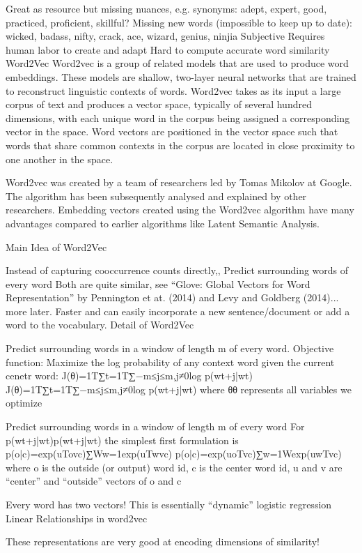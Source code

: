 Great as resource but missing nuances, e.g. synonyms: adept, expert, good, practiced, proficient, skillful?
Missing new words (impossible to keep up to date): wicked, badass, nifty, crack, ace, wizard, genius, ninjia
Subjective
Requires human labor to create and adapt
Hard to compute accurate word similarity
Word2Vec
Word2vec is a group of related models that are used to produce word embeddings. These models are shallow, two-layer neural networks that are trained to reconstruct linguistic contexts of words. Word2vec takes as its input a large corpus of text and produces a vector space, typically of several hundred dimensions, with each unique word in the corpus being assigned a corresponding vector in the space. Word vectors are positioned in the vector space such that words that share common contexts in the corpus are located in close proximity to one another in the space.

Word2vec was created by a team of researchers led by Tomas Mikolov at Google. The algorithm has been subsequently analysed and explained by other researchers. Embedding vectors created using the Word2vec algorithm have many advantages compared to earlier algorithms like Latent Semantic Analysis.

Main Idea of Word2Vec

Instead of capturing cooccurrence counts directly,,
Predict surrounding words of every word
Both are quite similar, see “Glove: Global Vectors for Word Representation” by Pennington et at. (2014) and Levy and Goldberg (2014)... more later.
Faster and can easily incorporate a new sentence/document or add a word to the vocabulary.
Detail of Word2Vec

Predict surrounding words in a window of length m of every word.
Objective function: Maximize the log probability of any context word given the current cenetr word:
J(θ)=1T∑t=1T∑−m≤j≤m,j≠0log p(wt+j|wt)
J(θ)=1T∑t=1T∑−m≤j≤m,j≠0log p(wt+j|wt)
where θθ represents all variables we optimize

Predict surrounding words in a window of length m of every word
For p(wt+j|wt)p(wt+j|wt) the simplest first formulation is
p(o|c)=exp(uTovc)∑Ww=1exp(uTwvc)
p(o|c)=exp(uoTvc)∑w=1Wexp(uwTvc)
where o is the outside (or output) word id, c is the center word id, u and v are “center” and “outside” vectors of o and c

Every word has two vectors!
This is essentially “dynamic” logistic regression
Linear Relationships in word2vec

These representations are very good at encoding dimensions of similarity!

